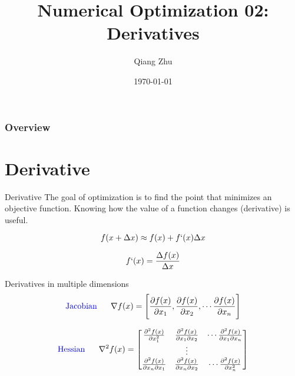 \documentclass{beamer}
\title[Optimization]{Numerical Optimization 02: Derivatives} %
\author{Qiang Zhu} %
\institute[University of Nevada Las Vegas] %
{
University of Nevada Las Vegas\\ %
\medskip
}
\date{\today} %
\begin{document}
\begin{frame}
\titlepage %
\end{frame}

\begin{frame}
\frametitle{Overview} %
\tableofcontents %
\end{frame}



\section{Derivative}
\begin{frame}{Derivative}
The goal of optimization is to find the point that minimizes an objective function. Knowing how the value of a function changes (derivative) is useful.

 \begin{equation*}
     f(x + \Delta x) \approx f(x) + f`(x)\Delta x
 \end{equation*}
 
\begin{equation*}
    f`(x) = \frac{\Delta f(x)}{\Delta x}
\end{equation*}

Derivatives in multiple dimensions
\begin{equation*}
\textrm{\textcolor{blue}{Jacobian}}~~~~~     \nabla f(x) = \Bigg[\frac{\partial f(x)}{\partial x_1}, \frac{\partial f(x)}{\partial x_2},  \cdots \frac{\partial f(x)}{\partial x_n} \Bigg]
\end{equation*}

\begin{equation*}
\textrm{\textcolor{blue}{Hessian}}~~~~~    \nabla^2 f(x) = 
    \begin{bmatrix}
\frac{\partial^2 f(x)}{\partial x_1^2 } & \frac{\partial^2 f(x)}{\partial x_1 \partial x_2 } & \cdots \frac{\partial^2 f(x)}{\partial x_1 \partial x_n }\\
 & \vdots & \\
\frac{\partial^2 f(x)}{\partial x_n \partial x_1} & \frac{\partial^2 f(x)}{\partial x_n \partial x_2 } & \cdots \frac{\partial^2 f(x)}{\partial x_n^2 } \\
\end{bmatrix}
\end{equation*}
\end{frame}
\end{document}
